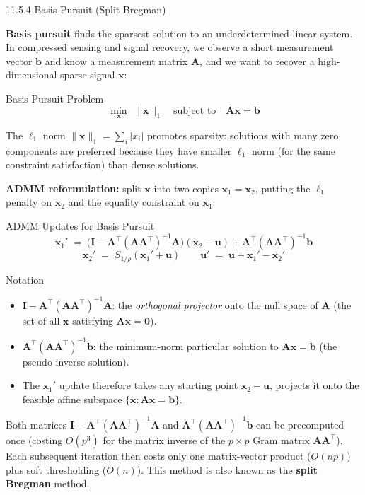 \documentclass[aspectratio=169,10pt]{beamer}
\newcommand{\bx}{\mathbf{x}}
\newcommand{\bu}{\mathbf{u}}
\newcommand{\bA}{\mathbf{A}}
\newcommand{\bI}{\mathbf{I}}
\newcommand{\bb}{\mathbf{b}}
\begin{document}
\begin{frame}[allowframebreaks]{11.5.4 Basis Pursuit (Split Bregman)}

  \textbf{Basis pursuit} finds the sparsest solution to an underdetermined
  linear system.  In compressed sensing and signal recovery, we observe
  a short measurement vector $\bb$ and know a measurement matrix $\bA$,
  and we want to recover a high-dimensional sparse signal $\bx$:

  \begin{block}{Basis Pursuit Problem}
    \[
      \min_{\bx}\; \|\bx\|_1
      \quad \text{subject to} \quad
      \bA\bx = \bb
    \]
  \end{block}

  The $\ell_1$ norm $\|\bx\|_1 = \sum_i |x_i|$ promotes sparsity: solutions
  with many zero components are preferred because they have smaller
  $\ell_1$ norm (for the same constraint satisfaction) than dense solutions.

  \medskip
  \textbf{ADMM reformulation:} split $\bx$ into two copies $\bx_1 = \bx_2$,
  putting the $\ell_1$ penalty on $\bx_2$ and the equality constraint on
  $\bx_1$:

  \begin{block}{ADMM Updates for Basis Pursuit}
    \[
      \bx_1' \;=\;
      \bigl(\bI - \bA^\top(\bA\bA^\top)^{-1}\bA\bigr)(\bx_2 - \bu)
      + \bA^\top(\bA\bA^\top)^{-1}\bb
    \]
    \[
      \bx_2' \;=\; S_{1/\rho}(\bx_1' + \bu)
      \qquad
      \bu' \;=\; \bu + \bx_1' - \bx_2'
    \]
  \end{block}

  \begin{block}{Notation}
    \begin{itemize}
      \item $\bI - \bA^\top(\bA\bA^\top)^{-1}\bA$: the
            \emph{orthogonal projector} onto the null space of $\bA$
            (the set of all $\bx$ satisfying $\bA\bx = \mathbf{0}$).
      \item $\bA^\top(\bA\bA^\top)^{-1}\bb$: the minimum-norm particular
            solution to $\bA\bx = \bb$ (the pseudo-inverse solution).
      \item The $\bx_1'$ update therefore takes any starting point
            $\bx_2 - \bu$, projects it onto the feasible affine subspace
            $\{\bx : \bA\bx = \bb\}$.
    \end{itemize}
  \end{block}

  Both matrices $\bI - \bA^\top(\bA\bA^\top)^{-1}\bA$ and
  $\bA^\top(\bA\bA^\top)^{-1}\bb$ can be precomputed once (costing
  $O(p^3)$ for the matrix inverse of the $p \times p$ Gram matrix
  $\bA\bA^\top$).  Each subsequent iteration then costs only one
  matrix-vector product ($O(np)$) plus soft thresholding ($O(n)$).
  This method is also known as the \textbf{split Bregman} method.

\end{frame}
\end{document}
